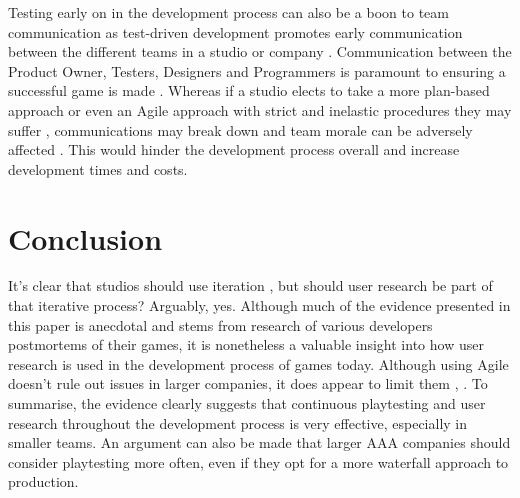 \documentclass{scrartcl}
\begin{document}
Testing early on in the development process can also be a boon to team communication as test-driven development promotes early communication between the different teams in a studio or company \cite{gallardo2009continuous:17}. Communication between the Product Owner, Testers, Designers and Programmers is paramount to ensuring a successful game is made \cite{mcdaniel2015communication:18}. 
Whereas if a studio elects to take a more plan-based approach or even an Agile approach with strict and inelastic procedures they may suffer \cite{cooke2012everything:19} \cite{davis2012agile:20}, communications may break down and team morale can be adversely affected \cite{cunningham2005costs:11}. This would hinder the development process overall and increase development times and costs.


\section{Conclusion}

It's clear that studios should use iteration \cite{o2015towards:21}, \cite{al2014towards:22} but should user research be part of that iterative process? Arguably, yes. Although much of the evidence presented in this paper is anecdotal and stems from research of various developers postmortems of their games, it is nonetheless a valuable insight into how user research is used in the development process of games today. Although using Agile doesn't rule out issues in larger companies, it does appear to limit them \cite{rico2009business:23}, \cite{batra2010balancing:24}. To summarise, the evidence clearly suggests that continuous playtesting and user research throughout the development process is very effective, especially in smaller teams. An argument can also be made that larger AAA companies should consider playtesting more often, even if they opt for a more waterfall approach to production.



\end{document}
